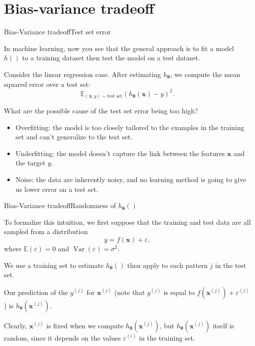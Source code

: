 \documentclass{beamer}
\renewcommand{\vec}[1]{\boldsymbol{#1}}
\def\Expec{\mathbb{E}}
\DeclareMathOperator*{\var}{Var}
\begin{document}
\section{Bias-variance tradeoff}

\begin{frame}{Bias-Variance tradeoff}{Test set error}

  In machine learning, now you see that the general approach is to
  \alert{fit} a model $h()$ to a \alert{training dataset} then
  \alert{test} the model on a \alert{test dataset}.

  \medskip

  Consider the linear regression case. After estimating $h_{\vec{\theta}}$,
  we compute the mean squared error over a test set:
  \[ \Expec_{(\vec{x},y) \sim \text{test set}} (h_{\vec{\theta}}(\vec{x})-y)^2. \]

  \medskip

  What are the possible cause of the test set error being \alert{too high}?
  \begin{itemize}
  \item \alert{Overfitting}: the model is too closely tailored to the examples
    in the training set and can't generalize to the test set.
  \item \alert{Underfitting}: the model doesn't capture the link between the
    features $\vec{x}$ and the target $y$.
  \item \alert{Noise}: the data are inherently noisy, and no learning method
    is going to give us lower error on a test set.
  \end{itemize}
  
\end{frame}


\begin{frame}{Bias-Variance tradeoff}{Randomness of $h_{\vec{\theta}}()$}

  To formalize this intuition, we first suppose that the training and test
  data are all sampled from a distribution
  \[ y = f(\vec{x}) + \varepsilon, \]
  where $\Expec(\varepsilon) = 0$ and $\var(\varepsilon) = \sigma^2$.

  \medskip

  We use a training set to estimate $h_{\vec{\theta}}()$ then apply to each pattern
  $j$ in the test set.

  \medskip

  Our \alert{prediction} of the $y^{(j)}$ for $\vec{x}^{(j)}$ (note that $y^{(j)}$ is equal to
  $f(\vec{x}^{(j)})+\varepsilon^{(j)}$) is $h_{\vec{\theta}}(\vec{x}^{(j)})$.

  \medskip

  Clearly, $\vec{x}^{(j)}$ is fixed when we compute
  $h_{\vec{\theta}}(\vec{x}^{(j)})$, but
  $h_{\vec{\theta}}(\vec{x}^{(j)})$ itself is \alert{random}, since it
  depends on the values $\varepsilon^{(i)}$ in the training set.
    
\end{frame}
\end{document}

